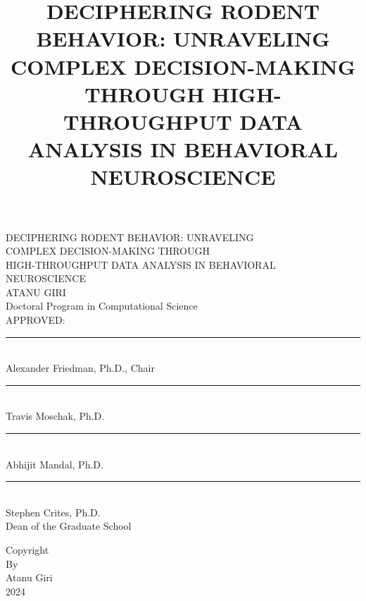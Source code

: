 \documentclass{article}
\begin{document}
\title{DECIPHERING RODENT BEHAVIOR: UNRAVELING COMPLEX DECISION-MAKING THROUGH HIGH-THROUGHPUT DATA ANALYSIS IN BEHAVIORAL NEUROSCIENCE}
\setcounter{page}{1}  %

\thispagestyle{empty}
{\centering 
DECIPHERING RODENT BEHAVIOR: UNRAVELING\\ 
COMPLEX DECISION-MAKING THROUGH\\
HIGH-THROUGHPUT DATA ANALYSIS IN BEHAVIORAL \\
NEUROSCIENCE\\
\vspace{4em}
ATANU GIRI\\
\vspace{1em}
Doctoral Program in Computational Science\\}
\vspace{4em}
\hspace*{0.5\linewidth}APPROVED:
\vspace{4em}
\hspace*{0.5\linewidth}\rule{0.5\linewidth}{0.5mm}\\
\hspace*{0.5\linewidth}Alexander Friedman, Ph.D., Chair\\
\vspace{2em}
\hspace*{0.5\linewidth}\rule{0.5\linewidth}{0.5mm}\\
\hspace*{0.5\linewidth}Travis Moschak, Ph.D.\\
\vspace{2em}
\hspace*{0.5\linewidth}\rule{0.5\linewidth}{0.5mm}\\
\hspace*{0.5\linewidth}Abhijit Mandal, Ph.D.\\

\vfill
\flushleft
\rule{0.5\linewidth}{0.5mm}\\
Stephen Crites, Ph.D.\\
Dean of the Graduate School

\clearpage

\thispagestyle{empty}
\vfill
\begin{center}
    Copyright\textcopyright\\
    By\\
    Atanu Giri\\
    2024\\
\end{center}
\vfill
\end{document}
